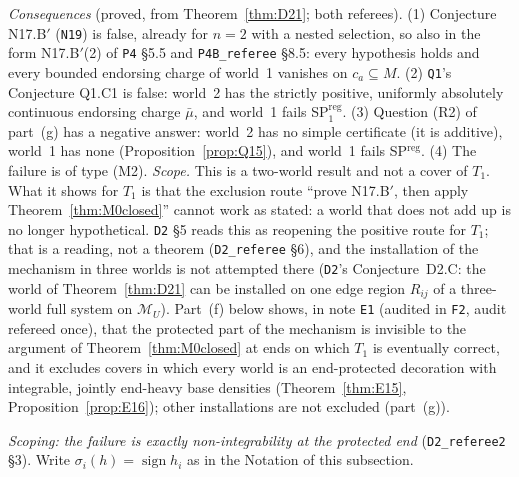 \documentclass[11pt]{article}
\theoremstyle{definition}
\theoremstyle{remark}
\newcommand{\M}{\mathcal M}
\newcommand{\src}[1]{\texttt{#1}}
\begin{document}
\emph{Consequences} (proved, from Theorem~\ref{thm:D21}; both referees). (1) Conjecture N17.B$'$ (\src{N19}) is false, already for $n=2$ with a nested selection, so also in the form N17.B$'$(2) of \src{P4} \S5.5 and \src{P4B\_referee} \S8.5: every hypothesis holds and every bounded endorsing charge of world~1 vanishes on $c_a\subseteq M$. (2) \src{Q1}'s Conjecture Q1.C1 is false: world~2 has the strictly positive, uniformly absolutely continuous endorsing charge $\bar\mu$, and world~1 fails SP$^{\mathrm{reg}}_1$. (3) Question (R2) of part~(g) has a negative answer: world~2 has no simple certificate (it is additive), world~1 has none (Proposition~\ref{prop:Q15}), and world~1 fails SP$^{\mathrm{reg}}$. (4) The failure is of type (M2). \emph{Scope.} This is a two-world result and not a cover of $T_1$. What it shows for $T_1$ is that the exclusion route ``prove N17.B$'$, then apply Theorem~\ref{thm:M0closed}'' cannot work as stated: a world that does not add up is no longer hypothetical. \src{D2} \S5 reads this as reopening the positive route for $T_1$; that is a reading, not a theorem (\src{D2\_referee} \S6), and the installation of the mechanism in three worlds is not attempted there (\src{D2}'s Conjecture~D2.C: the world of Theorem~\ref{thm:D21} can be installed on one edge region $R_{ij}$ of a three-world full system on $\M_U$). Part~(f) below shows, in note \src{E1} (audited in \src{F2}, audit refereed once), that the protected part of the mechanism is invisible to the argument of Theorem~\ref{thm:M0closed} at ends on which $T_1$ is eventually correct, and it excludes covers in which every world is an end-protected decoration with integrable, jointly end-heavy base densities (Theorem~\ref{thm:E15}, Proposition~\ref{prop:E16}); other installations are not excluded (part~(g)).

\emph{Scoping: the failure is exactly non-integrability at the protected end} (\src{D2\_referee2} \S3). Write $\sigma_i(h)=\operatorname{sign}h_i$ as in the Notation of this subsection.
\end{document}
